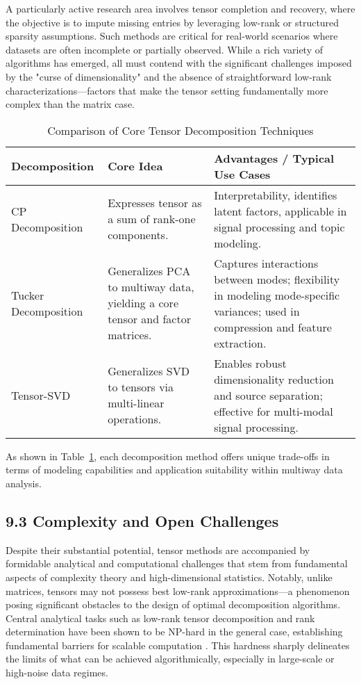 \documentclass[11pt]{article}
\begin{document}
A particularly active research area involves tensor completion and recovery, where the objective is to impute missing entries by leveraging low-rank or structured sparsity assumptions. Such methods are critical for real-world scenarios where datasets are often incomplete or partially observed. While a rich variety of algorithms has emerged, all must contend with the significant challenges imposed by the "curse of dimensionality" and the absence of straightforward low-rank characterizations—factors that make the tensor setting fundamentally more complex than the matrix case.

\begin{table}[ht]
\centering
\caption{Comparison of Core Tensor Decomposition Techniques}\label{tab:tensor_decomp_comparison}
\begin{tabular}{|l|p{4cm}|p{4cm}|}
\hline
\textbf{Decomposition} & \textbf{Core Idea} & \textbf{Advantages / Typical Use Cases} \\
\hline
CP Decomposition & Expresses tensor as a sum of rank-one components. & Interpretability, identifies latent factors, applicable in signal processing and topic modeling. \\
\hline
Tucker Decomposition & Generalizes PCA to multiway data, yielding a core tensor and factor matrices. & Captures interactions between modes; flexibility in modeling mode-specific variances; used in compression and feature extraction. \\
\hline
Tensor-SVD & Generalizes SVD to tensors via multi-linear operations. & Enables robust dimensionality reduction and source separation; effective for multi-modal signal processing. \\
\hline
\end{tabular}
\end{table}

As shown in Table~\ref{tab:tensor_decomp_comparison}, each decomposition method offers unique trade-offs in terms of modeling capabilities and application suitability within multiway data analysis.

\subsection{9.3 Complexity and Open Challenges}

Despite their substantial potential, tensor methods are accompanied by formidable analytical and computational challenges that stem from fundamental aspects of complexity theory and high-dimensional statistics. Notably, unlike matrices, tensors may not possess best low-rank approximations—a phenomenon posing significant obstacles to the design of optimal decomposition algorithms. Central analytical tasks such as low-rank tensor decomposition and rank determination have been shown to be NP-hard in the general case, establishing fundamental barriers for scalable computation \cite{ref104}. This hardness sharply delineates the limits of what can be achieved algorithmically, especially in large-scale or high-noise data regimes.
\end{document}
